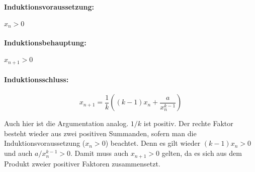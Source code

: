 \documentclass[10pt, a4paper]{article}
\begin{document}

		\paragraph{Induktionsvoraussetzung:} %
		\label{par:induktionsvoraussetzung_}
		
			$x_n > 0$


		\paragraph{Induktionsbehauptung:} %
		\label{par:induktionsbehauptung_}
		
			$x_{n+1} > 0$


		\paragraph{Induktionsschluss:} %
		\label{par:induktionsschluss_}
		
			\[
				x_{n+1} = \frac{1}{k}\left( (k-1)x_n + \frac{a}{x_n^{k-1}} \right)
			\]

			Auch hier ist die Argumentation analog. $1/k$ ist positiv. Der rechte Faktor besteht wieder aus zwei positiven Summanden, sofern man die Induktionsvoraussetzung ($x_n > 0$) beachtet. Denn es gilt wieder $(k-1)x_n > 0$ und auch $a/x_n^{k-1} > 0$. Damit muss auch $x_{n+1} > 0$ gelten, da es sich aus dem Produkt zweier positiver Faktoren zusammensetzt.\\

\end{document}
